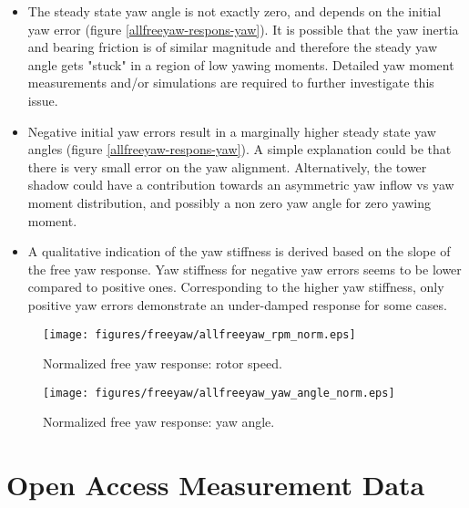 \documentclass[a4paper]{jpconf}
\begin{document}
\begin{itemize}
	\item The steady state yaw angle is not exactly zero, and depends on the initial yaw error (figure \ref{allfreeyaw-respons-yaw}). It is possible that the yaw inertia and bearing friction is of similar magnitude and therefore the steady yaw angle gets "stuck" in a region of low yawing moments. Detailed yaw moment measurements and/or simulations are required to further investigate this issue.
	\item Negative initial yaw errors result in a marginally higher steady state yaw angles (figure \ref{allfreeyaw-respons-yaw}). A simple explanation could be that there is very small error on the yaw alignment. Alternatively, the tower shadow could have a contribution towards an asymmetric yaw inflow vs yaw moment distribution, and possibly a non zero yaw angle for zero yawing moment.
	\item A qualitative indication of the yaw stiffness is derived based on the slope of the free yaw response. Yaw stiffness for negative yaw errors seems to be lower compared to positive ones. Corresponding to the higher yaw stiffness, only positive yaw errors demonstrate an under-damped response for some cases.
\end{itemize}


\begin{figure}[h]
\begin{minipage}{\textwidth}
\centering
\texttt{[image: figures/freeyaw/allfreeyaw\_rpm\_norm.eps]}
\caption{\label{allfreeyaw-respons-rpm-norm} Normalized free yaw response: rotor speed.}
\end{minipage}
\begin{minipage}{\textwidth}
\centering
\texttt{[image: figures/freeyaw/allfreeyaw\_yaw\_angle\_norm.eps]}
\caption{\label{allfreeyaw-respons-yaw-norm} Normalized free yaw response: yaw angle.}
\end{minipage} 
\end{figure}


\section{Open Access Measurement Data}
\end{document}
